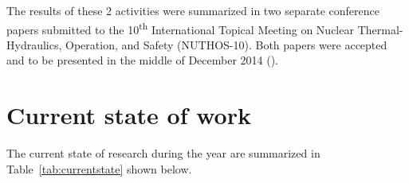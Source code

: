 \documentclass[11pt,titlepage]{article}
\begin{document}
\begin{table}[t]
\begin{minipage}[b]{.50\textwidth}
    \label{fig:fpc_regfd}
\end{minipage}
\end{table}

The results of these 2 activities were summarized in two separate conference 
papers submitted to the 10\textsuperscript{th} International Topical Meeting on 
Nuclear Thermal-Hydraulics, Operation, and Safety (NUTHOS-10). 
Both papers were accepted and to be presented in the middle of December 2014 
(\cite{Wicaksono2014d,Wicaksono2014e}).

\section{Current state of work}

The current state of research during the year are summarized in 
Table~\ref{tab:currentstate} shown below.
\end{document}
